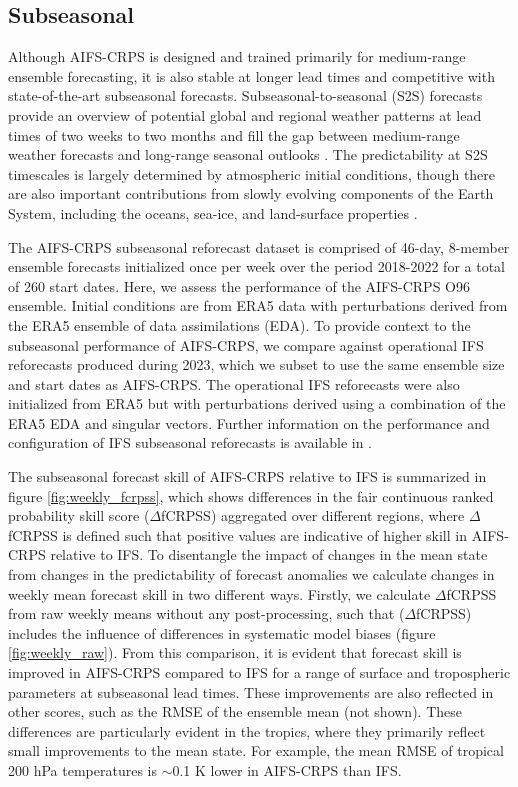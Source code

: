 \documentclass{article}
\begin{document}
\subsection{Subseasonal}\label{section:s2s}
Although AIFS-CRPS is designed and trained primarily for medium-range ensemble forecasting, it is also stable at longer lead times and competitive with state-of-the-art subseasonal forecasts. Subseasonal-to-seasonal (S2S) forecasts provide an overview of potential global and regional weather patterns at lead times of two weeks to two months and fill the gap between medium-range weather forecasts and long-range seasonal outlooks \citep{vitart2008vareps, white2017s2s, vitart2018s2s}. The predictability at S2S timescales is largely determined by atmospheric initial conditions, though there are also important contributions from slowly evolving components of the Earth System, including the oceans, sea-ice, and land-surface properties \citep{meehl2021initialized}.
 
The AIFS-CRPS subseasonal reforecast dataset is comprised of 46-day, 8-member ensemble forecasts initialized once per week over the period 2018-2022 for a total of 260 start dates. Here, we assess the performance of the AIFS-CRPS O96 ensemble. Initial conditions are from ERA5 data with perturbations derived from the ERA5 ensemble of data assimilations (EDA). To provide context to the subseasonal performance of AIFS-CRPS, we compare against operational IFS reforecasts produced during 2023, which we subset to use the same ensemble size and start dates as AIFS-CRPS. The operational IFS reforecasts were also initialized from ERA5 but with perturbations derived using a combination of the ERA5 EDA and singular vectors. Further information on the performance and configuration of IFS subseasonal reforecasts is available in \citet{roberts2023euro}. 

The subseasonal forecast skill of AIFS-CRPS relative to IFS is summarized in figure \ref{fig:weekly_fcrpss}, which shows differences in the fair continuous ranked probability skill score ($\Delta$fCRPSS) aggregated over different regions, where $\Delta$fCRPSS is defined such that positive values are indicative of higher skill in AIFS-CRPS relative to IFS. To disentangle the impact of changes in the mean state from changes in the predictability of forecast anomalies we calculate changes in weekly mean forecast skill in two different ways. Firstly, we calculate $\Delta$fCRPSS from raw weekly means without any post-processing, such that ($\Delta$fCRPSS) includes the influence of differences in systematic model biases (figure \ref{fig:weekly_raw}). From this comparison, it is evident that forecast skill is improved in AIFS-CRPS compared to IFS for a range of surface and tropospheric parameters at subseasonal lead times. These improvements are also reflected in other scores, such as the RMSE of the ensemble mean (not shown). These differences are particularly evident in the tropics, where they primarily reflect small improvements to the mean state. For example, the mean RMSE of tropical 200 hPa temperatures is $\sim$0.1 K lower in AIFS-CRPS than IFS. 
\end{document}
